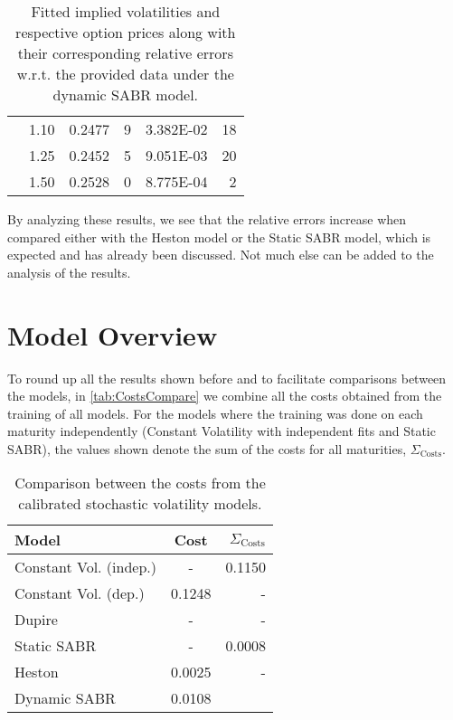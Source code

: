 \begin{table}[H]
\begin{tabular}{@{}cccrcr@{}}
 & 1.10 & 0.2477 & 9 & \num{3.382E-02} & 18 \\
 & 1.25 & 0.2452 & 5 & \num{9.051E-03} & 20 \\
 & 1.50 & 0.2528 & 0 & \num{8.775E-04} & 2 \\ \bottomrule
\end{tabular}
  \caption[Fitted implied volatilities and respective option prices along with their corresponding relative errors w.r.t. the provided data under the dynamic SABR model.]{Fitted implied volatilities and respective option prices along with their corresponding relative errors w.r.t. the provided data under the dynamic SABR model.}
  \label{tab:DS}
\end{table}

By analyzing these results, we see that the relative errors increase when compared either with the Heston model or the Static SABR model, which is expected and has already been discussed.
Not much else can be added to the analysis of the results.


\vfill
\newpage

\section{Model Overview}
To round up all the results shown before and to facilitate comparisons between the models, in \autoref{tab:CostsCompare} we combine all the costs obtained from the training of all models. For the models where the training was done on each maturity independently (Constant Volatility with independent fits and Static SABR), the values shown denote the sum of the costs for all maturities, $\Sigma_{\mathrm{Costs}}$.
\begin{table}[H]
    \centering
        \renewcommand{\arraystretch}{0.8}
\begin{tabular}{@{}lcr@{}}
\toprule
 Model & Cost & $\Sigma_{\mathrm{Costs}}$ \\ \midrule
Constant Vol. (indep.) & - & 0.1150 \\
Constant Vol. (dep.) & 0.1248 & - \\
Dupire & - & - \\
Static SABR & - & 0.0008 \\
Heston & 0.0025 & - \\
Dynamic SABR & 0.0108\\
\bottomrule
\end{tabular}
  \caption[Comparison between the costs from the calibrated stochastic volatility models.]{Comparison between the costs from the calibrated stochastic volatility models.}
  \label{tab:CostsCompare}
\end{table}

